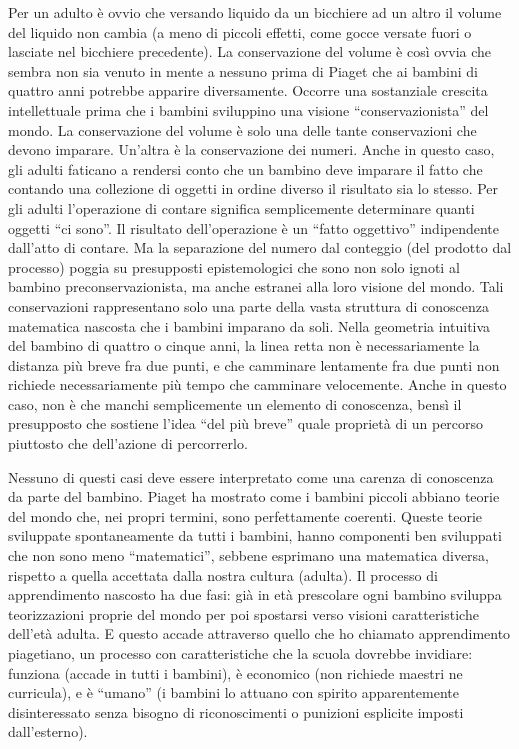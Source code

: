 Per un adulto è ovvio che versando liquido da un bicchiere ad un altro il volume del liquido non cambia (a meno di piccoli effetti, come gocce versate fuori o lasciate nel bicchiere precedente). La conservazione del volume è così ovvia che sembra non sia venuto in mente a nessuno prima di Piaget che ai bambini di quattro anni potrebbe apparire diversamente. Occorre una sostanziale crescita intellettuale prima che i bambini sviluppino una visione “conservazionista” del mondo. La conservazione del volume è solo una delle tante conservazioni che devono imparare.  Un'altra è la conservazione dei numeri. Anche in questo caso, gli adulti faticano a rendersi conto che un bambino   deve imparare il fatto che contando una collezione di oggetti in ordine diverso il risultato sia lo stesso. Per gli adulti l'operazione di contare significa semplicemente determinare quanti oggetti “ci sono”. Il risultato dell'operazione è un “fatto oggettivo” indipendente dall'atto di contare. Ma la separazione del numero dal conteggio (del prodotto dal processo) poggia su presupposti epistemologici che sono non solo ignoti al bambino preconservazionista, ma anche estranei alla loro visione del mondo. Tali conservazioni rappresentano solo una parte della vasta struttura di conoscenza matematica nascosta che i bambini imparano da soli. Nella geometria intuitiva del bambino di quattro o cinque anni, la linea retta non è necessariamente la distanza più breve fra due punti, e che camminare lentamente fra due punti non richiede necessariamente più tempo che camminare velocemente. Anche in questo caso, non è che manchi semplicemente un elemento di conoscenza, bensì il presupposto che sostiene l'idea “del più breve” quale proprietà di un percorso piuttosto che dell'azione di percorrerlo. 

Nessuno di questi casi deve essere interpretato come una carenza di conoscenza da parte del bambino. Piaget ha mostrato come i bambini piccoli abbiano teorie del mondo che, nei propri termini, sono perfettamente coerenti. Queste teorie sviluppate spontaneamente da tutti i bambini, hanno componenti ben sviluppati che non sono meno “matematici”, sebbene esprimano una matematica diversa, rispetto a quella accettata dalla nostra cultura (adulta). Il processo di apprendimento nascosto ha due fasi: già in età prescolare ogni bambino sviluppa teorizzazioni proprie del mondo per poi spostarsi verso visioni caratteristiche dell'età adulta. E questo accade attraverso quello che ho chiamato apprendimento piagetiano, un processo con caratteristiche che la scuola dovrebbe invidiare: funziona (accade in tutti i bambini), è economico (non richiede maestri ne curricula), e è “umano” (i bambini lo attuano con spirito apparentemente disinteressato senza bisogno di riconoscimenti o punizioni esplicite imposti dall'esterno).  

